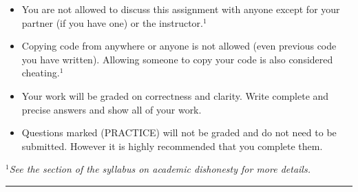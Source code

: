 \documentclass[11pt]{exam}
\begin{document}
\begin{itemize}
\item You are not allowed to discuss this assignment with anyone except for your partner (if you have one) or the instructor.$^1$
\item Copying code from anywhere or anyone is not allowed (even previous code you have written).  Allowing someone to copy your code is also considered cheating.$^1$
\item Your work will be graded on correctness and clarity.  Write complete and precise answers and show all of your work.  
\item Questions marked (PRACTICE) will not be graded and do not need to be submitted. However it is highly recommended that you complete them.
\end{itemize}
\emph{$^1$See the section of the syllabus on academic dishonesty for more details.}\\
\hrule
\vspace{2em}
\\ 
\end{document}
